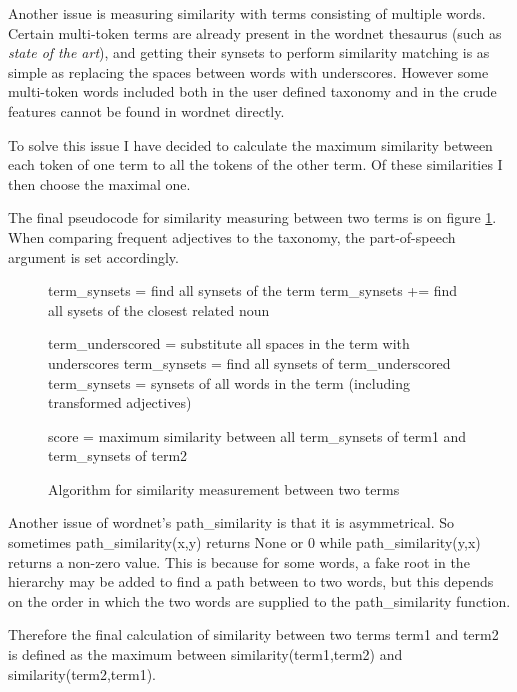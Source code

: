 Another issue is measuring similarity with terms consisting of multiple words. Certain multi-token terms are already present in the wordnet thesaurus (such as \textit{state of the art}), and getting their synsets to perform similarity matching is as simple as replacing the spaces between words with underscores. However some multi-token words included both in the user defined taxonomy and in the crude features cannot be found in wordnet directly.

To solve this issue I have decided to calculate the maximum similarity between each token of one term to all the tokens of the other term. Of these similarities I then choose the maximal one.

The final pseudocode for similarity measuring between two terms is on figure \ref{img:sim_alg}. When comparing frequent adjectives to the taxonomy, the part-of-speech argument is set accordingly.
\begin{figure}

\begin{algorithm}[H]
   {	
		{
		term\_synsets = find all synsets of the term \;
			{term\_synsets += find all sysets of the closest related noun}
	}

	\Else
		{ 
		term\_underscored = substitute all spaces in the term with underscores \;
		term\_synsets = find all synsets of term\_underscored \;
	}
		{
		term\_synsets = synsets of all words in the term (including transformed adjectives) \;
		}
}
score = maximum similarity between all term\_synsets of term1 and term\_synsets of term2 \;

\end{algorithm}
 \caption{Algorithm for similarity measurement between two terms}
	\label{img:sim_alg}
\end{figure}

Another issue of wordnet's path\_similarity is that it is asymmetrical. So sometimes path\_similarity(x,y) returns None or 0 while path\_similarity(y,x) returns a non-zero value. This is because for some words, a fake root in the hierarchy may be added to find a path between to two words, but this depends on the order in which the two words are supplied to the path\_similarity function. 

Therefore the final calculation of similarity between two terms term1 and term2 is defined as the maximum between similarity(term1,term2) and similarity(term2,term1).

